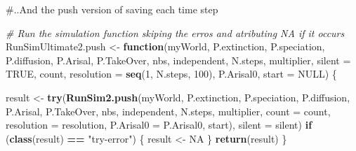 \documentclass[]{book}
\newenvironment{Shaded}{\begin{snugshade}}{\end{snugshade}}
\newcommand{\KeywordTok}[1]{\textcolor[rgb]{0.13,0.29,0.53}{\textbf{{#1}}}}
\newcommand{\DataTypeTok}[1]{\textcolor[rgb]{0.13,0.29,0.53}{{#1}}}
\newcommand{\DecValTok}[1]{\textcolor[rgb]{0.00,0.00,0.81}{{#1}}}
\newcommand{\StringTok}[1]{\textcolor[rgb]{0.31,0.60,0.02}{{#1}}}
\newcommand{\CommentTok}[1]{\textcolor[rgb]{0.56,0.35,0.01}{\textit{{#1}}}}
\newcommand{\OtherTok}[1]{\textcolor[rgb]{0.56,0.35,0.01}{{#1}}}
\newcommand{\ControlFlowTok}[1]{\textcolor[rgb]{0.13,0.29,0.53}{\textbf{{#1}}}}
\newcommand{\OperatorTok}[1]{\textcolor[rgb]{0.81,0.36,0.00}{\textbf{{#1}}}}
\newcommand{\NormalTok}[1]{{#1}}
\theoremstyle{definition}
\theoremstyle{definition}
\theoremstyle{remark}
\begin{document}
\#..And the push version of saving each time step

\begin{Shaded}
\begin{Highlighting}[]
\CommentTok{# Run the simulation function skiping the erros and atributing NA if it occurs}
\NormalTok{RunSimUltimate2.push <-}\StringTok{ }\ControlFlowTok{function}\NormalTok{(myWorld, P.extinction, P.speciation,}
\NormalTok{                            P.diffusion, P.Arisal, P.TakeOver, nbs, independent,}
\NormalTok{                            N.steps, multiplier,}
                            \DataTypeTok{silent =} \OtherTok{TRUE}\NormalTok{, count, }\DataTypeTok{resolution =} \KeywordTok{seq}\NormalTok{(}\DecValTok{1}\NormalTok{, N.steps, }\DecValTok{100}\NormalTok{),}
\NormalTok{                            P.Arisal0, }\DataTypeTok{start =} \OtherTok{NULL}\NormalTok{) \{}

\NormalTok{  result <-}\StringTok{ }\KeywordTok{try}\NormalTok{(}\KeywordTok{RunSim2.push}\NormalTok{(myWorld, P.extinction, P.speciation,}
\NormalTok{                        P.diffusion, P.Arisal, P.TakeOver, nbs,}
\NormalTok{                        independent, N.steps,}
\NormalTok{                        multiplier, }\DataTypeTok{count =}\NormalTok{ count, }\DataTypeTok{resolution =}\NormalTok{ resolution,}
                        \DataTypeTok{P.Arisal0 =}\NormalTok{ P.Arisal0, start),}
                \DataTypeTok{silent =}\NormalTok{ silent)}
  \ControlFlowTok{if}\NormalTok{ (}\KeywordTok{class}\NormalTok{(result) }\OperatorTok{==}\StringTok{ "try-error"}\NormalTok{) \{}
\NormalTok{    result <-}\StringTok{ }\OtherTok{NA}
\NormalTok{  \}}
  \KeywordTok{return}\NormalTok{(result)}
\NormalTok{\}}
\end{Highlighting}
\end{Shaded}
\end{document}
